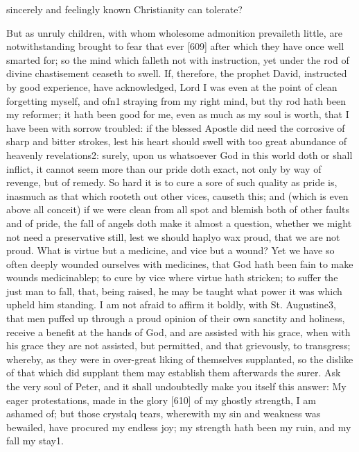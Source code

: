 sincerely and feelingly known Christianity can tolerate?

But as unruly children, with whom wholesome admonition prevaileth little, are notwithstanding brought to fear that ever [609] after which they have once well smarted for; so the mind which falleth not with instruction, yet under the rod of divine chastisement ceaseth to swell. If, therefore, the prophet David, instructed by good experience, have acknowledged, Lord I was even at the point of clean forgetting myself, and ofn1 straying from my right mind, but thy rod hath been my reformer; it hath been good for me, even as much as my soul is worth, that I have been with sorrow troubled: if the blessed Apostle did need the corrosive of sharp and bitter strokes, lest his heart should swell with too great abundance of heavenly revelations2: surely, upon us whatsoever God in this world doth or shall inflict, it cannot seem more than our pride doth exact, not only by way of revenge, but of remedy. So hard it is to cure a sore of such quality as pride is, inasmuch as that which rooteth out other vices, causeth this; and (which is even above all conceit) if we were clean from all spot and blemish both of other faults and of pride, the fall of angels doth make it almost a question, whether we might not need a preservative still, lest we should haplyo wax proud, that we are not proud. What is virtue but a medicine, and vice but a wound? Yet we have so often deeply wounded ourselves with medicines, that God hath been fain to make wounds medicinablep; to cure by vice where virtue hath stricken; to suffer the just man to fall, that, being raised, he may be taught what power it was which upheld him standing. I am not afraid to affirm it boldly, with St. Augustine3, that men puffed up through a proud opinion of their own sanctity and holiness, receive a benefit at the hands of God, and are assisted with his grace, when with his grace they are not assisted, but permitted, and that grievously, to transgress; whereby, as they were in over-great liking of themselves supplanted, so the dislike of that which did supplant them may establish them afterwards the surer. Ask the very soul of Peter, and it shall undoubtedly make you itself this answer: My eager protestations, made in the glory [610] of my ghostly strength, I am ashamed of; but those crystalq tears, wherewith my sin and weakness was bewailed, have procured my endless joy; my strength hath been my ruin, and my fall my stay1.

